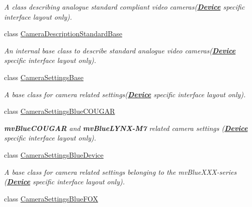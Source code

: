 \begin{DoxyCompactItemize}
\begin{DoxyCompactList}\small\item\em A class describing analogue standard compliant video cameras({\bfseries \hyperlink{classmv_i_m_p_a_c_t_1_1acquire_1_1_device}{Device}} specific interface layout only). \end{DoxyCompactList}\item 
class \hyperlink{classmv_i_m_p_a_c_t_1_1acquire_1_1_camera_description_standard_base}{Camera\+Description\+Standard\+Base}
\begin{DoxyCompactList}\small\item\em An internal base class to describe standard analogue video cameras({\bfseries \hyperlink{classmv_i_m_p_a_c_t_1_1acquire_1_1_device}{Device}} specific interface layout only). \end{DoxyCompactList}\item 
class \hyperlink{classmv_i_m_p_a_c_t_1_1acquire_1_1_camera_settings_base}{Camera\+Settings\+Base}
\begin{DoxyCompactList}\small\item\em A base class for camera related settings({\bfseries \hyperlink{classmv_i_m_p_a_c_t_1_1acquire_1_1_device}{Device}} specific interface layout only). \end{DoxyCompactList}\item 
class \hyperlink{classmv_i_m_p_a_c_t_1_1acquire_1_1_camera_settings_blue_c_o_u_g_a_r}{Camera\+Settings\+Blue\+C\+O\+U\+G\+A\+R}
\begin{DoxyCompactList}\small\item\em {\bfseries mv\+Blue\+C\+O\+U\+G\+A\+R} and {\bfseries mv\+Blue\+L\+Y\+N\+X-\/\+M7} related camera settings ({\bfseries \hyperlink{classmv_i_m_p_a_c_t_1_1acquire_1_1_device}{Device}} specific interface layout only). \end{DoxyCompactList}\item 
class \hyperlink{classmv_i_m_p_a_c_t_1_1acquire_1_1_camera_settings_blue_device}{Camera\+Settings\+Blue\+Device}
\begin{DoxyCompactList}\small\item\em A base class for camera related settings belonging to the mv\+Blue\+X\+X\+X-\/series ({\bfseries \hyperlink{classmv_i_m_p_a_c_t_1_1acquire_1_1_device}{Device}} specific interface layout only). \end{DoxyCompactList}\item 
class \hyperlink{classmv_i_m_p_a_c_t_1_1acquire_1_1_camera_settings_blue_f_o_x}{Camera\+Settings\+Blue\+F\+O\+X}

\end{DoxyCompactItemize}
